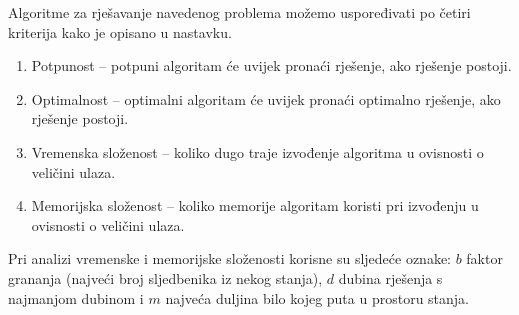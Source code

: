 Algoritme za rješavanje navedenog problema možemo uspoređivati po četiri kriterija \cite{russelNorvig2003:aima} kako je opisano u nastavku.

\begin{enumerate}
	\item Potpunost -- potpuni algoritam će uvijek pronaći rješenje, ako rješenje postoji.
	\item Optimalnost -- optimalni algoritam će uvijek pronaći optimalno rješenje, ako rješenje postoji.
	\item Vremenska složenost -- koliko dugo traje izvođenje algoritma u ovisnosti o veličini ulaza.
	\item Memorijska složenost -- koliko memorije algoritam koristi pri izvođenju u ovisnosti o veličini ulaza.
\end{enumerate}

Pri analizi vremenske i memorijske složenosti korisne su sljedeće oznake: \( b \) faktor grananja (najveći broj sljedbenika iz nekog stanja), \( d \) dubina rješenja s najmanjom dubinom i \( m \) najveća duljina bilo kojeg puta u prostoru stanja.